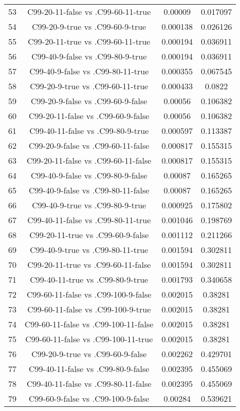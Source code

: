 \documentclass[a4paper,10pt]{article}
\begin{document}
\begin{landscape}
\begin{table}[!htp]
\begin{tabular}{cccc}
53&C99-20-11-false vs .C99-60-11-true&0.00009&0.017097\\
54&C99-20-9-true vs .C99-60-9-true&0.000138&0.026126\\
55&C99-20-11-true vs .C99-60-11-true&0.000194&0.036911\\
56&C99-40-9-false vs .C99-80-9-true&0.000194&0.036911\\
57&C99-40-9-false vs .C99-80-11-true&0.000355&0.067545\\
58&C99-20-9-true vs .C99-60-11-true&0.000433&0.0822\\
59&C99-20-9-false vs .C99-60-9-false&0.00056&0.106382\\
60&C99-20-11-false vs .C99-60-9-false&0.00056&0.106382\\
61&C99-40-11-false vs .C99-80-9-true&0.000597&0.113387\\
62&C99-20-9-false vs .C99-60-11-false&0.000817&0.155315\\
63&C99-20-11-false vs .C99-60-11-false&0.000817&0.155315\\
64&C99-40-9-false vs .C99-80-9-false&0.00087&0.165265\\
65&C99-40-9-false vs .C99-80-11-false&0.00087&0.165265\\
66&C99-40-9-true vs .C99-80-9-true&0.000925&0.175802\\
67&C99-40-11-false vs .C99-80-11-true&0.001046&0.198769\\
68&C99-20-11-true vs .C99-60-9-false&0.001112&0.211266\\
69&C99-40-9-true vs .C99-80-11-true&0.001594&0.302811\\
70&C99-20-11-true vs .C99-60-11-false&0.001594&0.302811\\
71&C99-40-11-true vs .C99-80-9-true&0.001793&0.340658\\
72&C99-60-11-false vs .C99-100-9-false&0.002015&0.38281\\
73&C99-60-11-false vs .C99-100-9-true&0.002015&0.38281\\
74&C99-60-11-false vs .C99-100-11-false&0.002015&0.38281\\
75&C99-60-11-false vs .C99-100-11-true&0.002015&0.38281\\
76&C99-20-9-true vs .C99-60-9-false&0.002262&0.429701\\
77&C99-40-11-false vs .C99-80-9-false&0.002395&0.455069\\
78&C99-40-11-false vs .C99-80-11-false&0.002395&0.455069\\
79&C99-60-9-false vs .C99-100-9-false&0.00284&0.539621\\

\end{tabular}
\end{table}
\end{landscape}
\end{document}
